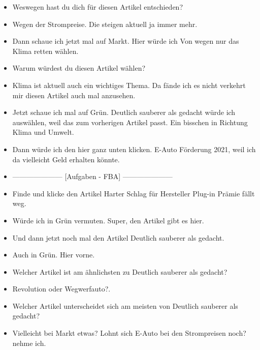 {\begin{itemize}[]
                  Also \flqq Lohnt sich E-Auto bei den Strompreisen noch\frqq{}.
            \item {} Weswegen hast du dich für diesen Artikel entschieden?
            \item {} Wegen der Strompreise. Die steigen aktuell ja immer mehr.
            \item {} Dann schaue ich jetzt mal auf Markt.
                  Hier würde ich \flqq Von wegen nur das Klima retten\frqq{} wählen.
            \item {} Warum würdest du diesen Artikel wählen?
            \item {} Klima ist aktuell auch ein wichtiges Thema. Da fände ich es nicht verkehrt mir diesen Artikel auch mal anzusehen.
            \item {} Jetzt schaue ich mal auf Grün.
                  \flqq Deutlich sauberer als gedacht\frqq{} würde ich auswählen, weil das zum vorherigen Artikel passt.
                  Ein bisschen in Richtung Klima und Umwelt.
            \item {} Dann würde ich den hier ganz unten klicken. \flqq E-Auto Förderung 2021\frqq{}, weil ich da vielleicht Geld erhalten könnte.
            \item {---------------------} [Aufgaben - FBA] {---------------------}
            \item {} Finde und klicke den Artikel \flqq Harter Schlag für Hersteller Plug-in Prämie fällt weg\frqq{}.
            \item {} Würde ich in Grün vermuten. Super, den Artikel gibt es hier.
            \item {} Und dann jetzt noch mal den Artikel \flqq Deutlich sauberer als gedacht\frqq{}.
            \item {} Auch in Grün. Hier vorne.
            \item {} Welcher Artikel ist am ähnlichsten zu \flqq Deutlich sauberer als gedacht\frqq{}?
            \item {} \flqq Revolution oder Wegwerfauto?\frqq{}.
            \item {} Welcher Artikel unterscheidet sich am meisten von \flqq Deutlich sauberer als gedacht\frqq{}?
            \item {} Vielleicht bei Markt etwas?
                  \flqq Lohnt sich E-Auto bei den Strompreisen noch?\frqq{} nehme ich.

\end{itemize}}

